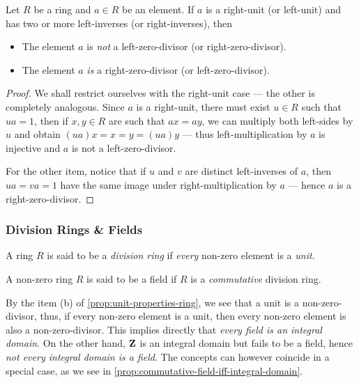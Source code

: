 %
\begin{lemma}
    \label{lem:unit-two-or-more-inverses}
    Let \(R\) be a ring and \(a \in R\) be an element. If \(a\) is a right-unit (or
    left-unit) and has two or more left-inverses (or right-inverses), then
    \begin{itemize}\setlength\itemsep{0em}
        \item The element \(a\) is \emph{not} a left-zero-divisor (or
              right-zero-divisor).
        \item The element \(a\) \emph{is} a right-zero-divisor (or left-zero-divisor).
    \end{itemize}
\end{lemma}
%

%
\begin{proof}
    We shall restrict ourselves with the right-unit case --- the other is completely
    analogous. Since \(a\) is a right-unit, there must exist \(u \in R\) such that
    \(u a = 1\), then if \(x, y \in R\) are such that \(a x = a y\), we can multiply
    both left-sides by \(u\) and obtain \((u a) x = x = y = (u a) y\) --- thus
    left-multiplication by \(a\) is injective and \(a\) is not a left-zero-divisor.

    For the other item, notice that if \(u\) and \(v\) are distinct left-inverses of
    \(a\), then \(u a = v a = 1\) have the same image under right-multiplication by
    \(a\) --- hence \(a\) is a right-zero-divisor.
\end{proof}
%

\subsubsection{Division Rings \& Fields}

%
\begin{definition}
    \label{def:division-ring}
    A ring \(R\) is said to be a \emph{division ring} if \emph{every} non-zero
    element is a \emph{unit}.
\end{definition}
%

%
\begin{definition}[Field]
    \label{def:field}
    A non-zero ring \(R\) is said to be a field if \(R\) is a \emph{commutative}
    division ring.
\end{definition}
%

%
\begin{remark}
    \label{rem:field-and-integral-domain}
    By the item (b) of \cref{prop:unit-properties-ring}, we see that a unit is a
    non-zero-divisor, thus, if every non-zero element is a unit, then every non-zero
    element is also a non-zero-divisor. This implies directly that \emph{every field
        is an integral domain}. On the other hand, \(\mathbf{Z}\) is an integral domain but fails
    to be a field, hence \emph{not every integral domain is a field}. The concepts
    can however coincide in a special case, as we see in
    \cref{prop:commutative-field-iff-integral-domain}.
\end{remark}
%

